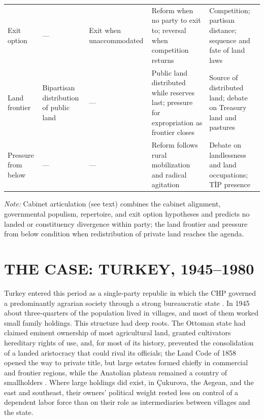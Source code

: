\documentclass[12pt]{article}
\begin{document}
\begin{table}[p]
\begin{threeparttable}
\begin{tabular}{L{2.3cm}L{3.5cm}L{3.4cm}L{2.9cm}L{3.9cm}}
Exit option & --- & Exit when unaccommodated & Reform when no party to exit to; reversal when competition returns & Competition; partisan distance; sequence and fate of land laws \\
Land frontier & Bipartisan distribution of public land & --- & Public land distributed while reserves last; pressure for expropriation as frontier closes & Source of distributed land; debate on Treasury land and pastures \\
Pressure from below & --- & --- & Reform follows rural mobilization and radical agitation & Debate on landlessness and land occupations; TİP presence \\
\bottomrule
\end{tabular}
\begin{tablenotes}\footnotesize
\item \textit{Note:} Cabinet articulation (see text) combines the cabinet alignment, governmental populism, repertoire, and exit option hypotheses and predicts no landed or constituency divergence within party; the land frontier and pressure from below condition when redistribution of private land reaches the agenda.
\end{tablenotes}
\end{threeparttable}
\end{table}

\section*{THE CASE: TURKEY, 1945--1980}

Turkey entered this period as a single-party republic in which the CHP governed a predominantly agrarian society through a strong bureaucratic state \citep{heper1985,keyder1987}. In 1945 about three-quarters of the population lived in villages, and most of them worked small family holdings. This structure had deep roots. The Ottoman state had claimed eminent ownership of most agricultural land, granted cultivators hereditary rights of use, and, for most of its history, prevented the consolidation of a landed aristocracy that could rival its officials; the Land Code of 1858 opened the way to private title, but large estates formed chiefly in commercial and frontier regions, while the Anatolian plateau remained a country of smallholders \citep{keyder1987,pamuk2018}. Where large holdings did exist, in Çukurova, the Aegean, and the east and southeast, their owners' political weight rested less on control of a dependent labor force than on their role as intermediaries between villages and the state.
\end{document}
